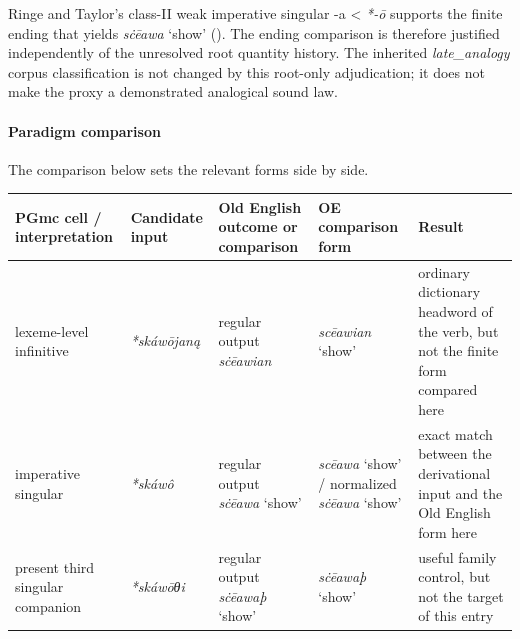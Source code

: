 \documentclass[
  british,
  a4paper,
]{article}
\newcounter{none} %
\begin{document}
Ringe and Taylor's class-II weak imperative singular -a \textless{}
\emph{*-ō} supports the finite ending that yields \emph{sċēawa} `show'
(). The ending
comparison is therefore justified independently of the unresolved root
quantity history. The inherited \emph{late\_analogy} corpus
classification is not changed by this root-only adjudication; it does
not make the proxy a demonstrated analogical sound law.

\paragraph{Paradigm comparison}\label{paradigm-comparison-21}

The comparison below sets the relevant forms side by side.

{\def\LTcaptype{none} %
\begin{longtable}[]{@{}
  >{\raggedright\arraybackslash}p{}
  >{\raggedright\arraybackslash}p{}
  >{\raggedright\arraybackslash}p{}
  >{\raggedright\arraybackslash}p{}
  >{\raggedright\arraybackslash}p{}@{}}
\toprule\noalign{}
\begin{minipage}[b]{\linewidth}\raggedright
PGmc cell / interpretation
\end{minipage} & \begin{minipage}[b]{\linewidth}\raggedright
Candidate input
\end{minipage} & \begin{minipage}[b]{\linewidth}\raggedright
Old English outcome or comparison
\end{minipage} & \begin{minipage}[b]{\linewidth}\raggedright
OE comparison form
\end{minipage} & \begin{minipage}[b]{\linewidth}\raggedright
Result
\end{minipage} \\
\midrule\noalign{}
\endhead
\bottomrule\noalign{}
\endlastfoot
lexeme-level infinitive & {\emph{*skáwōjaną}} & regular output
{\emph{sċēawian}} & {\emph{scēawian}} `show' & ordinary dictionary
headword of the verb, but not the finite form compared here \\
imperative singular & {\emph{*skáwô}} & regular output {\emph{sċēawa}}
`show' & {\emph{scēawa}} `show' / normalized {\emph{sċēawa}} `show' &
exact match between the derivational input and the Old English form
here \\
present third singular companion & {\emph{*skáwōθi}} & regular output
{\emph{sċēawaþ}} `show' & {\emph{sċēawaþ}} `show' & useful family
control, but not the target of this entry \\
\end{longtable}
}
\end{document}

